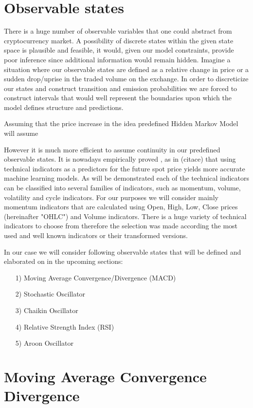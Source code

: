 \section{Observable states}

	There is a huge number of observable variables that one could abstract from cryptocurrency market. A possibility of discrete states within the given state space is plausible and feasible, it would, given our model constraints, provide poor inference since additional information would remain hidden. Imagine a situation where our observable states are defined as a relative change in price or a sudden drop/uprise in the traded volume on the exchange. In order to discreticize our states and construct transition and emission probabilities we are forced to construct intervals that would well represent the boundaries upon which the model defines structure and predictions. 
	
Assuming that the price increase in   the idea predefined Hidden Markov Model will assume
	
	However it is much more efficient to assume continuity in our predefined observable states. It is nowadays empirically proved , as in (citace) that using technical indicators as a predictors for the future spot price yields more accurate machine learning models. As will be demonstrated each of the technical indicators can be classified into several families of indicators, such as momentum, volume, volatility and cycle indicators. For our purposes we will consider mainly momentum indicators that are calculated using Open, High, Low, Close prices (hereinafter "OHLC") and Volume indicators. There is a huge variety of technical indicators to choose from therefore the selection was made according the most used and well known indicators or their transformed versions. 

In our case we will consider following observable states that will be defined and elaborated on in the upcoming sections:

\begin{itemize}
\item[1)] Moving Average Convergence/Divergence (MACD)
\item[2)] Stochastic Oscillator
\item[3)] Chaikin Oscillator 
\item[4)] Relative Strength Index (RSI)
\item[5)] Aroon Oscillator 
\end{itemize}


\section{Moving Average Convergence Divergence}

